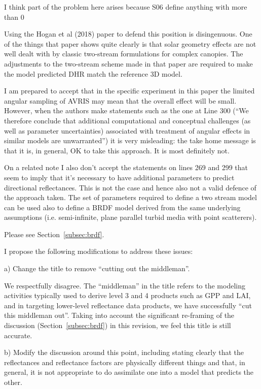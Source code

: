 \begin{reviewer}
  I think part of the problem here arises because S06 define anything with more than 0

  Using the Hogan et al (2018) paper to defend this position is disingenuous. One of the things that paper shows quite clearly is that solar geometry effects are not well dealt with by classic two-stream formulations for complex canopies. The adjustments to the two-stream scheme made in that paper are required to make the model predicted DHR match the reference 3D model.

  I am prepared to accept that in the specific experiment in this paper the limited angular sampling of AVRIS may mean that the overall effect will be small. However, when the authors make statements such as the one at Line 300 (“We therefore conclude that additional computational and conceptual challenges (as well as parameter uncertainties) associated with treatment of angular effects in similar models are unwarranted”) it is very misleading: the take home message is that it is, in general, OK to take this approach. It is most definitely not.

  On a related note I also don’t accept the statements on lines 269 and 299 that seem to imply that it’s necessary to have additional parameters to predict directional reflectances. This is not the case and hence also not a valid defence of the approach taken. The set of parameters required to define a two stream model can be used also to define a BRDF model derived from the same underlying assumptions (i.e. semi-infinite, plane parallel turbid media with point scatterers).
\end{reviewer}

Please see Section~\ref{subsec:brdf}.

\begin{reviewer}
  I propose the following modifications to address these issues:

  a) Change the title to remove ``cutting out the middleman''.
\end{reviewer}

We respectfully disagree.
The ``middleman'' in the title refers to the modeling activities typically used to derive level 3 and 4 products such as GPP and LAI,
and in targeting lower-level reflectance data products, we have successfully ``cut this middleman out''.
Taking into account the significant re-framing of the discussion (Section~\ref{subsec:brdf}) in this revision, we feel this title is still accurate.

\begin{reviewer}
  b) Modify the discussion around this point, including stating clearly that the reflectances and reflectance factors are physically different things and that, in general, it is not appropriate to do assimilate one into a model that predicts the other.
\end{reviewer}

